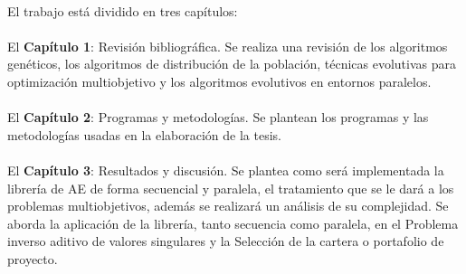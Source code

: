 \paragraph{}
El trabajo está dividido en tres capítulos:\\

\paragraph{}
El \textbf{Capítulo 1}: Revisión bibliográfica. Se realiza una revisión de los algoritmos genéticos, los algoritmos de distribución de la población, técnicas evolutivas para optimización multiobjetivo y los algoritmos evolutivos en entornos paralelos.

\paragraph{}
El \textbf{Capítulo 2}: Programas y metodologías. Se plantean los programas y las metodologías usadas en la elaboración de la tesis.

\paragraph{}
El \textbf{Capítulo 3}: Resultados y discusión. Se plantea como será implementada la librería de AE de forma secuencial y paralela, el tratamiento que se le dará a los problemas multiobjetivos, además se realizará un análisis de su complejidad. Se aborda la aplicación de la librería, tanto secuencia como paralela, en el Problema inverso aditivo de valores singulares y la Selección de la cartera o portafolio de proyecto.

